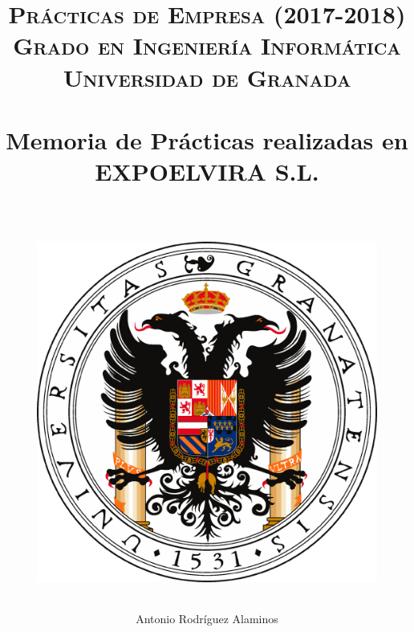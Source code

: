 


\title{	
\normalfont \normalsize 
\textsc{\textbf{Prácticas de Empresa (2017-2018)} \\ Grado en Ingeniería Informática \\ Universidad de Granada} \\ [25pt] %
\horrule{0.5pt} \\[0.4cm] %
\huge Memoria de Prácticas realizadas en EXPOELVIRA S.L. \\ %
\horrule{2pt} \\[0.5cm] %
\begin{figure}[H] %
	\centering
	\includegraphics[scale=0.5]{image/ugr.png}  %
\end{figure}
}

\author{Antonio Rodríguez Alaminos} %

